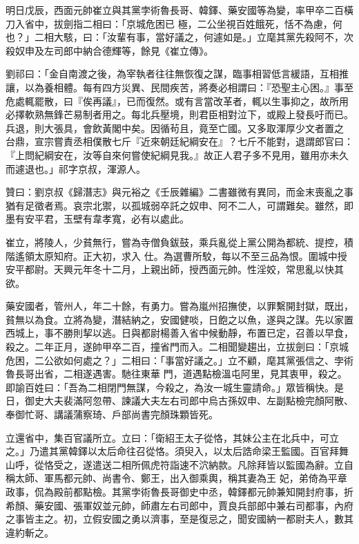 \begin{pinyinscope}
 明日戊辰，西面元帥崔立與其黨孛術魯長哥、韓鐸、藥安國等為變，率甲卒二百橫刀入省中，拔劍指二相曰：「京城危困已
 極，二公坐視百姓餓死，恬不為慮，何也？」二相大駭，曰：「汝輩有事，當好議之，何遽如是。」立麾其黨先殺阿不，次殺奴申及左司郎中納合德輝等，餘見《崔立傳》。



 劉祁曰：「金自南渡之後，為宰執者往往無恢復之謀，臨事相習低言緩語，互相推讓，以為養相體。每有四方災異、民間疾苦，將奏必相謂曰：『恐聖主心困。』事至危處輒罷散，曰『俟再議』，已而復然。或有言當改革者，輒以生事抑之，故所用必擇軟熟無鋒芒易制者用之。每北兵壓境，則君臣相對泣下，或殿上發長吁而已。兵退，則大張具，會飲黃閣中矣。因循茍且，竟至亡國。又多取渾厚少文者置之
 台鼎，宣宗嘗責丞相僕散七斤『近來朝廷紀綱安在』？七斤不能對，退謂郎官曰：『上問紀綱安在，汝等自來何嘗使紀綱見我。』故正人君子多不見用，雖用亦未久而遽退也。」祁字京叔，渾源人。



 贊曰：劉京叔《歸潛志》與元裕之《壬辰雜編》二書雖微有異同，而金末喪亂之事猶有足徵者焉。哀宗北禦，以孤城弱卒託之奴申、阿不二人，可謂難矣。雖然，即墨有安平君，玉壁有韋孝寬，必有以處此。



 崔立，將陵人，少貧無行，嘗為寺僧負鈸鼓，乘兵亂從上黨公開為都統、提控，積階遙領太原知府。正大初，求入
 仕。為選曹所駮，每以不至三品為恨。圍城中授安平都尉。天興元年冬十二月，上親出師，授西面元帥。性淫姣，常思亂以快其欲。



 藥安國者，管州人，年二十餘，有勇力。嘗為嵐州招撫使，以罪繫開封獄，既出，貧無以為食。立將為變，潛結納之，安國健啖，日飽之以魚，遂與之謀。先以家置西城上，事不勝則挈以逃。日與都尉楊善入省中候動靜，布置已定，召善以早食，殺之。二年正月，遂帥甲卒二百，撞省門而入。二相聞變趨出，立拔劍曰：「京城危困，二公欲如何處之？」二相曰：「事當好議之。」立不顧，麾其黨張信之、孛術魯長哥出省，二相遂遇害。馳往東華
 門，道遇點檢溫屯阿里，見其衷甲，殺之。即諭百姓曰：「吾為二相閉門無謀，今殺之，為汝一城生靈請命。」眾皆稱快。是日，御史大夫裴滿阿忽帶、諫議大夫左右司郎中烏古孫奴申、左副點檢完顏阿散、奉御忙哥、講議蒲察琦、戶部尚書完顏珠顆皆死。



 立還省中，集百官議所立。立曰：「衛紹王太子從恪，其妹公主在北兵中，可立之。」乃遣其黨韓鐸以太后命往召從恪。須臾入，以太后誥命梁王監國。百官拜舞山呼，從恪受之，遂遣送二相所佩虎符詣速不泬納款。凡除拜皆以監國為辭。立自稱太師、軍馬都元帥、尚書令、鄭王，出入御乘輿，稱其妻為王
 妃，弟倚為平章政事，侃為殿前都點檢。其黨孛術魯長哥御史中丞，韓鐸都元帥兼知開封府事，折希顏、藥安國、張軍奴並元帥，師肅左右司郎中，賈良兵部郎中兼右司都事，內府之事皆主之。初，立假安國之勇以濟事，至是復忌之，聞安國納一都尉夫人，數其違約斬之。




\end{pinyinscope}
